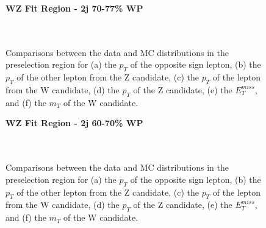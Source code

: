 \begin{figure}[H]
    \centering
    \textbf{WZ Fit Region - 2j 70-77\% WP}\\
    \\
    \\
    \caption{Comparisons between the data and MC distributions in the preselection region for (a) the $p_T$ of the opposite sign lepton, (b) the $p_T$ of the other lepton from the Z candidate, (c) the $p_T$ of the lepton from the W candidate, (d) the $p_T$ of the Z candidate, (e) the $E_T^{miss}$, and (f) the $m_T$ of the W candidate.}
    \label{kin:WP_2j_70_77}
\end{figure}

\begin{figure}[H]
    \centering
    \textbf{WZ Fit Region - 2j 60-70\% WP}\\
    \\
    \\
    \caption{Comparisons between the data and MC distributions in the preselection region for (a) the $p_T$ of the opposite sign lepton, (b) the $p_T$ of the other lepton from the Z candidate, (c) the $p_T$ of the lepton from the W candidate, (d) the $p_T$ of the Z candidate, (e) the $E_T^{miss}$, and (f) the $m_T$ of the W candidate.}
    \label{kin:WP_2j_60_70}
\end{figure}

